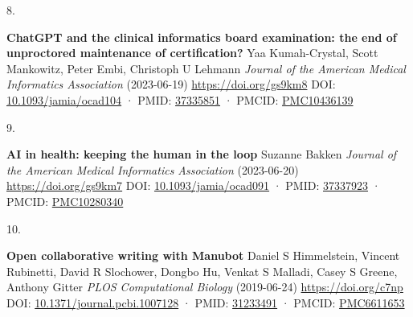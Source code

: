 \documentclass[
]{article}
\newlength{\cslhangindent}
\newlength{\csllabelwidth}
\newlength{\cslentryspacingunit} %
\newenvironment{CSLReferences}[2] %
 {%
  \setlength{\parindent}{0pt}
  \ifodd #1
  \let\oldpar\par
  \def\par{\hangindent=\cslhangindent\oldpar}
  \fi
  \setlength{\parskip}{#2\cslentryspacingunit}
 }%
 {}
\newcommand{\CSLBlock}[1]{#1\hfill\break}
\newcommand{\CSLLeftMargin}[1]{\parbox[t]{\csllabelwidth}{#1}}
\newcommand{\CSLRightInline}[1]{\parbox[t]{\linewidth - \csllabelwidth}{#1}\break}
\providecommand{\DIFaddbegin}{} %
\providecommand{\DIFaddend}{} %
\providecommand{\DIFdelbegin}{} %
\providecommand{\DIFdelend}{} %
\newcommand{\DIFscaledelfig}{0.5}
\newlength{\DIFdelgraphicswidth} %
\newlength{\DIFdelgraphicsheight} %
\newcommand{\DIFaddincludegraphics}[2][]{{\color{blue}\fbox{\DIFOincludegraphics[#1]{#2}}}} %
\newcommand{\DIFdelincludegraphics}[2][]{%
\sbox{\DIFdelgraphicsbox}{\DIFOincludegraphics[#1]{#2}}%
\settoboxwidth{\DIFdelgraphicswidth}{\DIFdelgraphicsbox} %
\settoboxtotalheight{\DIFdelgraphicsheight}{\DIFdelgraphicsbox} %
\scalebox{\DIFscaledelfig}{%
\parbox[b]{\DIFdelgraphicswidth}{\usebox{\DIFdelgraphicsbox}\\[-\baselineskip] \rule{\DIFdelgraphicswidth}{0em}}\llap{\resizebox{\DIFdelgraphicswidth}{\DIFdelgraphicsheight}{%
\setlength{\unitlength}{\DIFdelgraphicswidth}%
\begin{picture}(1,1)%
\thicklines\linethickness{2pt} %
{\color[rgb]{1,0,0}\put(0,0){\framebox(1,1){}}}%
{\color[rgb]{1,0,0}\put(0,0){\line( 1,1){1}}}%
{\color[rgb]{1,0,0}\put(0,1){\line(1,-1){1}}}%
\end{picture}%
}\hspace*{3pt}}} %
} %
\DeclareRobustCommand{\DIFaddbegin}{\DIFOaddbegin \let\includegraphics\DIFaddincludegraphics} %
\DeclareRobustCommand{\DIFaddend}{\DIFOaddend \let\includegraphics\DIFOincludegraphics} %
\DeclareRobustCommand{\DIFdelbegin}{\DIFOdelbegin \let\includegraphics\DIFdelincludegraphics} %
\DeclareRobustCommand{\DIFdelend}{\DIFOaddend \let\includegraphics\DIFOincludegraphics} %
\begin{document}
\begin{CSLReferences}{0}{0}
\leavevmode{}%
\CSLLeftMargin{8. }%
\CSLRightInline{\textbf{ChatGPT and the clinical informatics board examination: the end of unproctored maintenance of certification?}
\CSLBlock{Yaa Kumah-Crystal, Scott Mankowitz, Peter Embi, Christoph U Lehmann} \emph{Journal of the American Medical Informatics Association} (2023-06-19) \url{https://doi.org/gs9km8}
\CSLBlock{DOI: \href{https://doi.org/10.1093/jamia/ocad104}{10.1093/jamia/ocad104} · PMID: \href{https://www.ncbi.nlm.nih.gov/pubmed/37335851}{37335851} · PMCID: \href{https://www.ncbi.nlm.nih.gov/pmc/articles/PMC10436139}{PMC10436139}}}

\leavevmode{}%
\CSLLeftMargin{9. }%
\CSLRightInline{\textbf{AI in health: keeping the human in the loop}
\CSLBlock{Suzanne Bakken} \emph{Journal of the American Medical Informatics Association} (2023-06-20) \url{https://doi.org/gs9km7}
\CSLBlock{DOI: \href{https://doi.org/10.1093/jamia/ocad091}{10.1093/jamia/ocad091} · PMID: \href{https://www.ncbi.nlm.nih.gov/pubmed/37337923}{37337923} · PMCID: \href{https://www.ncbi.nlm.nih.gov/pmc/articles/PMC10280340}{PMC10280340}}}

\leavevmode\vadjust pre{\DIFdelbegin %
\DIFdelend \DIFaddbegin \hypertarget{ref-YuJbg3zO}{}\DIFaddend }%
\CSLLeftMargin{10. }%
\DIFdelbegin %
\DIFdelend \DIFaddbegin \CSLRightInline{\textbf{Open collaborative writing with Manubot}
\CSLBlock{Daniel S Himmelstein, Vincent Rubinetti, David R Slochower, Dongbo Hu, Venkat S Malladi, Casey S Greene, Anthony Gitter} \emph{PLOS Computational Biology} (2019-06-24) \url{https://doi.org/c7np}
\CSLBlock{DOI: \href{https://doi.org/10.1371/journal.pcbi.1007128}{10.1371/journal.pcbi.1007128} · PMID: \href{https://www.ncbi.nlm.nih.gov/pubmed/31233491}{31233491} · PMCID: \href{https://www.ncbi.nlm.nih.gov/pmc/articles/PMC6611653}{PMC6611653}}}
\DIFaddend 


\end{CSLReferences}
\end{document}
